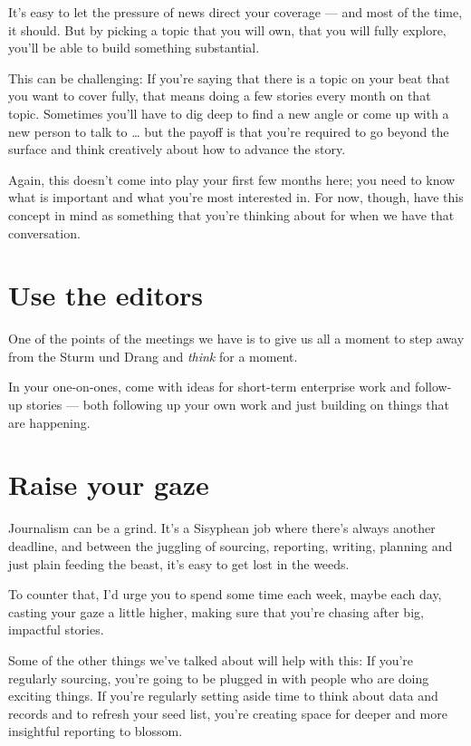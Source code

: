 \documentclass[
  12pt,
  american,
  letterpaperpaper,
  extrafontsizes,onecolumn,openright
  ]{memoir}
\newlength{\rf}
\begin{document}
It's easy to let the pressure of news direct your coverage --- and most of the time, it should. But by picking a topic that you will own, that you will fully explore, you'll be able to build something substantial.

This can be challenging: If you're saying that there is a topic on your beat that you want to cover fully, that means doing a few stories every month on that topic. Sometimes you'll have to dig deep to find a new angle or come up with a new person to talk to \ldots{} but the payoff is that you're required to go beyond the surface and think creatively about how to advance the story.

Again, this doesn't come into play your first few months here; you need to know what is important and what you're most interested in. For now, though, have this concept in mind as something that you're thinking about for when we have that conversation.

\hypertarget{use-the-editors-1}{%
\section*{Use the editors}\label{use-the-editors-1}}

One of the points of the meetings we have is to give us all a moment to step away from the Sturm und Drang and \emph{think} for a moment.

In your one-on-ones, come with ideas for short-term enterprise work and follow-up stories --- both following up your own work and just building on things that are happening.

\hypertarget{raise-your-gaze}{%
\section*{Raise your gaze}\label{raise-your-gaze}}

Journalism can be a grind. It's a Sisyphean job where there's always another deadline, and between the juggling of sourcing, reporting, writing, planning and just plain feeding the beast, it's easy to get lost in the weeds.

To counter that, I'd urge you to spend some time each week, maybe each day, casting your gaze a little higher, making sure that you're chasing after big, impactful stories.

Some of the other things we've talked about will help with this: If you're regularly sourcing, you're going to be plugged in with people who are doing exciting things. If you're regularly setting aside time to think about data and records and to refresh your seed list, you're creating space for deeper and more insightful reporting to blossom.
\end{document}
